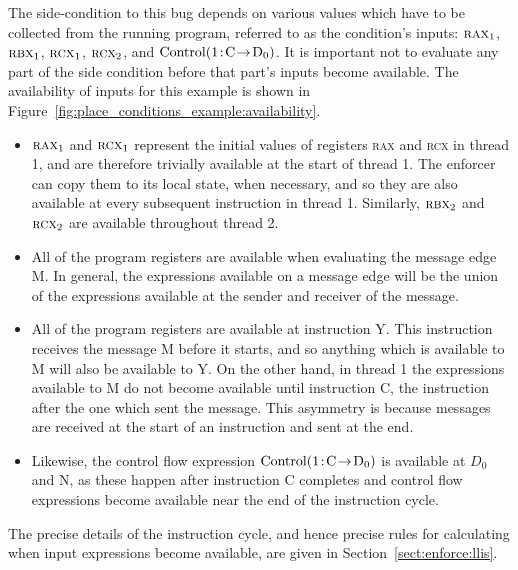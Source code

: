 The side-condition to this bug depends on various values which have to
be collected from the running program, referred to as the condition's
inputs: $\textsc{rax}_1$, $\textsc{rbx}_1$, $\textsc{rcx}_1$,
$\textsc{rcx}_2$, and $\mathrm{Control}(\mathrm{1}\!:\!\mathrm{C}\!\rightarrow\!\mathrm{D_0})$.  It is important not
to evaluate any part of the side condition before that part's inputs
become available.  The availability of inputs for this example is
shown in Figure~\ref{fig:place_conditions_example:availability}.

\begin{itemize}
\item $\textsc{rax}_1$ and $\textsc{rcx}_1$ represent the initial
  values of registers \textsc{rax} and \textsc{rcx} in thread 1, and
  are therefore trivially available at the start of thread 1.  The
  enforcer can copy them to its local state, when necessary, and so
  they are also available at every subsequent instruction in thread 1.
  Similarly, $\textsc{rbx}_2$ and $\textsc{rcx}_2$ are available
  throughout thread 2.
\item All of the program registers are available when evaluating the
  message edge M.  In general, the expressions available on a message
  edge will be the union of the expressions available at the sender and
  receiver of the message.
\item All of the program registers are available at instruction Y.
  This instruction receives the message M before it starts, and so
  anything which is available to M will also be available to Y.  On
  the other hand, in thread 1 the expressions available to M do not
  become available until instruction C, the instruction after the one
  which sent the message.  This asymmetry is because messages are
  received at the start of an instruction and sent at the end.
\item Likewise, the control flow expression $\mathrm{Control}(\mathrm{1}\!:\!\mathrm{C}\!\rightarrow\!\mathrm{D_0})$
  is available at $D_0$ and N, as these happen after instruction C
  completes and control flow expressions become available near the end
  of the instruction cycle.
\end{itemize}

The precise details of the instruction cycle, and hence precise rules
for calculating when input expressions become available, are given in
Section~\ref{sect:enforce:llis}.

